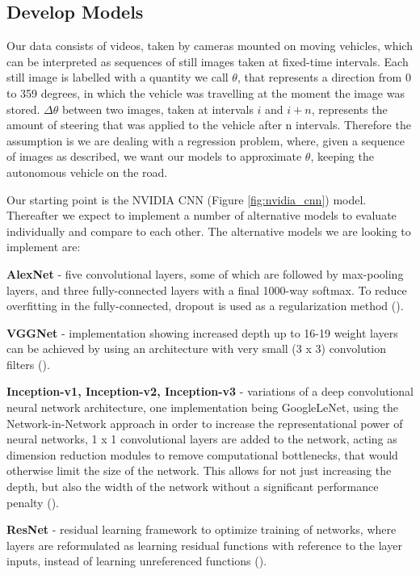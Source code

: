 \subsection{Develop Models}



Our data consists of videos, taken by cameras mounted on moving vehicles, which can be interpreted as sequences of still images taken at fixed-time intervals. Each still image is labelled with a quantity we call $\theta$, that represents a direction from 0 to 359 degrees, in which the vehicle was travelling at the moment the image was stored. $\Delta \theta$ between two images, taken at intervals $i$ and $i+n$, represents the amount of steering that was applied to the vehicle after n intervals. Therefore the assumption is we are dealing with a regression problem, where, given a sequence of images as described, we want our models to approximate $\theta$, keeping the autonomous vehicle on the road.

Our starting point is the NVIDIA CNN (Figure \ref{fig:nvidia_cnn}) model. Thereafter we expect to implement a number of alternative models to evaluate individually and compare to each other. 
The alternative models we are looking to implement are:  


\textbf{AlexNet} - five convolutional layers, some of which are followed by max-pooling layers, and three fully-connected layers with a final 1000-way softmax. To reduce overfitting in the fully-connected, dropout is used as a regularization method (\cite{NIPS2012_4824}).  

\textbf{VGGNet} -  implementation showing increased depth up to 16-19 weight layers can be achieved by using an architecture with very small (3 x 3) convolution filters (\cite{VGGNET:Simonyan15}).

\textbf{Inception-v1, Inception-v2, Inception-v3} - variations of a deep convolutional neural network architecture, one implementation being GoogleLeNet, using the Network-in-Network approach in order to increase the representational power of
neural networks, 1 x 1 convolutional layers are added to the network, acting as dimension reduction modules to remove computational bottlenecks, that would otherwise limit the size of the network. This allows for not
just increasing the depth, but also the width of the network
without a significant performance penalty (\cite{GoogleLeNet:43022}). 

\textbf{ResNet} - residual learning framework to optimize training of networks, where layers are reformulated as learning residual functions with reference to the layer inputs, instead of learning unreferenced functions (\cite{RESNET:he2015deep}).
